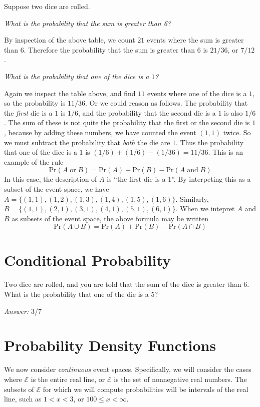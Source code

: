 \begin{xexample}
Suppose two dice are rolled.

\medskip
\emph{What is the probability that
the sum is greater than 6?}

\medskip
By inspection of the above table, we count $21$ events where
the sum is greater than $6$.  Therefore the probability
that the sum is greater than $6$ is $21/36$, or $7/12$.

\medskip
\emph{What is the probability that one of the dice is a $1$?}

\medskip
Again we inspect the table above, and find $11$ events where
one of the dice is a $1$, so the probability is $11/36$.
Or we could reason as follows.  The probability that the
\emph{first} die is a $1$ is $1/6$, and the probability
that the second die is a $1$ is also $1/6$.  The sum
of these is not quite the probability that the first
or the second die is $1$, because by adding these
numbers, we have counted the event $(1,1)$ twice.
So we must subtract the probability that \emph{both}
the die are $1$. Thus the probability that one of the dice
is a $1$ is $(1/6)+(1/6)-(1/36) = 11/36$.  This is an
example of the rule
\[
   \textrm{Pr}(A \;\textrm{or}\; B) = \textrm{Pr}(A) + \textrm{Pr}(B) - \textrm{Pr}(A \;\textrm{and}\; B)
\]
In this case, the description of $A$ is ``the first die is a 1''.
By interpeting this as a subset of the event space, we have
$A = \{(1,1),(1,2),(1,3),(1,4),(1,5),(1,6)\}$.
Similarly, $B = \{(1,1),(2,1),(3,1),(4,1),(5,1),(6,1)\}$.
When we intepret $A$ and $B$ as subsets of the event space, the
above formula may be written
\[
  \textrm{Pr}(A \cup B) = \textrm{Pr}(A) + \textrm{Pr}(B) - \textrm{Pr}(A \cap B)
\]
\end{xexample}

\section{Conditional Probability}
%
\begin{xexample}
Two dice are rolled, and you are told that the sum of the dice
is greater than 6.  What is the probability that one of the die
is a 5?

\medskip
\noindent
\emph{Answer:} 3/7
\end{xexample}
%
\section{Probability Density Functions}
%
We now consider \emph{continuous} event spaces. Specifically,
we will consider the cases where $\mathcal{E}$ is the entire real line,
or $\mathcal{E}$ is the set of nonnegative real numbers.
The subsets of $\mathcal{E}$ for which we will compute probabilities
will be intervals of the real line, such as $1 < x < 3$, or
$100 \le x < \infty$.

